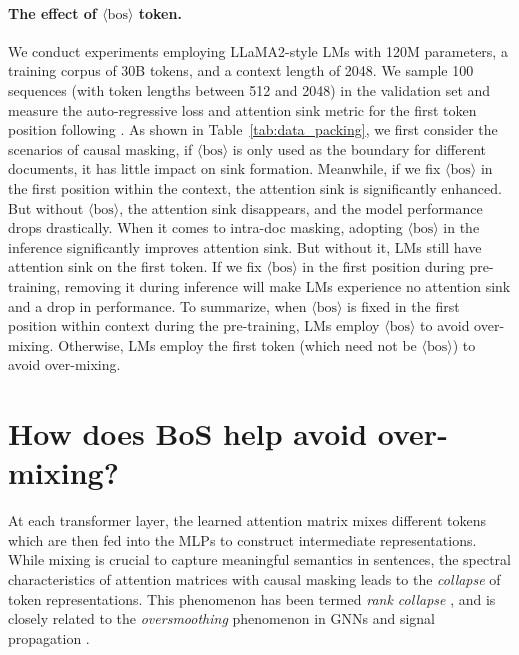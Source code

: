\documentclass{article} %
\newcommand{\bos}{\ensuremath{\langle\text{bos}\rangle}\xspace}
\begin{document}
\paragraph{The effect of \bos token.} We conduct experiments employing LLaMA2-style LMs with 120M parameters, a training corpus of 30B tokens, and a context length of 2048. We sample 100 sequences (with token lengths between 512 and 2048) in the validation set and measure the auto-regressive loss and attention sink metric for the first token position following \citet{gu2025when}. As shown in Table~\ref{tab:data_packing}, we first consider the scenarios of causal masking, if \bos is only used as the boundary for different documents, it has little impact on sink formation. Meanwhile, if we fix \bos in the first position within the context, the attention sink is significantly enhanced. But without \bos, the attention sink disappears, and the model performance drops drastically. When it comes to intra-doc masking, adopting \bos in the inference significantly improves attention sink. But without it, LMs still have attention sink on the first token. If we fix \bos in the first position during pre-training, removing it during inference will make LMs experience no attention sink and a drop in performance. To summarize, when \bos is fixed in the first position within context during the pre-training, LMs employ \bos to avoid over-mixing. Otherwise, LMs employ the first token (which need not be \bos) to avoid over-mixing. 


\section{How does BoS help avoid over-mixing?}
\label{app:collapse}

At each transformer layer, the learned attention matrix mixes different tokens which are then fed into the MLPs to construct intermediate representations. While mixing is crucial to capture meaningful semantics in sentences, the spectral characteristics of attention matrices with causal masking leads to the \textit{collapse} of token representations. This phenomenon has been termed \textit{rank collapse} \citep{dong2021attention}, and is closely related to the \textit{oversmoothing} phenomenon in GNNs \citep{di2022understanding} and signal propagation \citep{noci2022signal,arroyo2025vanishing}. 
\end{document}
